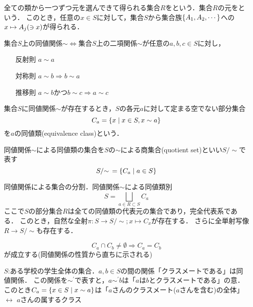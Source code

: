 \documentclass[main]{subfiles}
\begin{document}
		全ての類から一つずつ元を選んできて得られる集合$R$をという．集合$R$の元をという．
		このとき，任意の$x\in S$に対して，集合$S$から集合族$\qty{A_1,A_2,\cdots}$への$x\mapsto A_j\qty(\ni x)$が得られる．

		\begin{dfn}[同値関係]
			集合$S$上の同値関係$\sim$$\Leftrightarrow$集合$S$上の二項関係$\sim$が任意の$a,b,c\in S$に対し，
			\begin{itemize}
				\item[反射則] $a\sim a$
				\item[対称則] $a\sim b \Rightarrow b\sim a$
				\item[推移則] $a\sim b\text{かつ}b\sim c\Rightarrow a\sim c$
			\end{itemize}
		\end{dfn}

		\begin{dfn}[同値類]
			集合$S$に同値関係$\sim$が存在するとき，$S$の各元$a$に対して定まる空でない部分集合
			\[C_a=\qty{x\mid x\in S,x\sim a}\]
			を$a$の同値類(equivalence class)という．
		\end{dfn}

		\begin{dfn}[商集合]
			同値関係$\sim$による同値類の集合を$S$の$\sim$による商集合(quotient set)といい$S/{\sim}$で表す
			\[S/{\sim}\,=\qty{C_a\mid a\in S}\]
		\end{dfn}

		\begin{dfn}[同値類別]
			同値関係による集合の分割．同値関係$\sim$による同値類別
			\[S=\bigsqcup_{a\in R\subset S}C_a\]
			ここで$S$の部分集合$R$は全ての同値類の代表元の集合であり，完全代表系である．
			このとき，自然な全射$\pi:S\to S/{\sim};x\mapsto C_x$が存在する．
			さらに全単射写像$R\to S/{\sim}$も存在する．
		\end{dfn}
		\begin{screen}
			\[C_a\cap C_b\neq\emptyset\Rightarrow C_a=C_b\]
			が成立する(同値関係の性質から直ちに示される)
		\end{screen}

		\begin{ex}
			$S$:ある学校の学生全体の集合．$a,b\in S$の間の関係「クラスメートである」は同値関係．
			この関係を$\sim^\prime$で表すと，$a\sim^\prime b$は「$a$は$b$とクラスメートである」の意．このとき$C_a=\qty{x\in S\mid x\sim a}$は「$a$さんのクラスメート($a$さんを含む)の全体」$\leftrightarrow$ $a$さんの属するクラス
		\end{ex}
\end{document}
